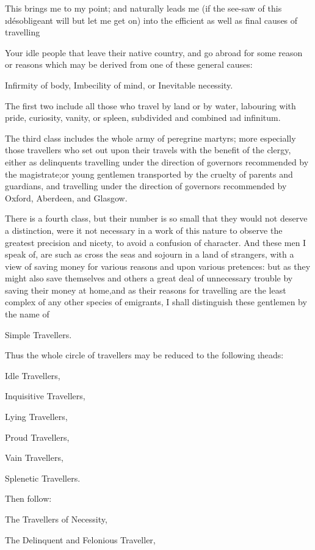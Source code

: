 \documentclass[twoside]{article}
\begin{document}
This brings me to my point; and naturally leads me (if the see-saw of
this \i{désobligeant} will but let me get on) into the efficient as well as
final causes of travelling\tsk 

Your idle people that leave their native country, and go abroad for some
reason or reasons which may be derived from one of these general causes:\tsk 

  Infirmity of body,
  Imbecility of mind, or
  Inevitable necessity.

The first two include all those who travel by land or by water, labouring
with pride, curiosity, vanity, or spleen, subdivided and combined \i{ad
infinitum}.

The third class includes the whole army of peregrine martyrs; more
especially those travellers who set out upon their travels with the
benefit of the clergy, either as delinquents travelling under the
direction of governors recommended by the magistrate;\tsk or young gentlemen
transported by the cruelty of parents and guardians, and travelling under
the direction of governors recommended by Oxford, Aberdeen, and Glasgow.

There is a fourth class, but their number is so small that they would not
deserve a distinction, were it not necessary in a work of this nature to
observe the greatest precision and nicety, to avoid a confusion of
character.  And these men I speak of, are such as cross the seas and
sojourn in a land of strangers, with a view of saving money for various
reasons and upon various pretences: but as they might also save
themselves and others a great deal of unnecessary trouble by saving their
money at home,\tsk and as their reasons for travelling are the least complex
of any other species of emigrants, I shall distinguish these gentlemen by
the name of

                            Simple Travellers.

Thus the whole circle of travellers may be reduced to the following
\i{heads}:\tsk 

  Idle Travellers,

  Inquisitive Travellers,

  Lying Travellers,

  Proud Travellers,

  Vain Travellers,

  Splenetic Travellers.

Then follow:

  The Travellers of Necessity,

  The Delinquent and Felonious Traveller,
\end{document}
